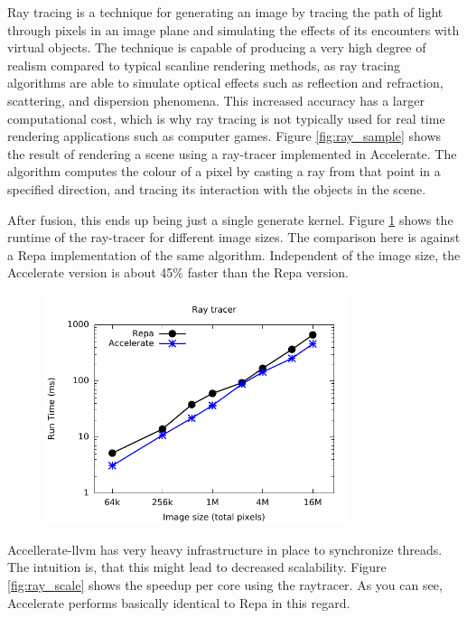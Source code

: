 \documentclass[a4paper,bibliography=totocnumbered,parskip,headsepline]{scrbook}
\begin{document}
Ray tracing is a technique for generating an image by tracing the path of light through pixels in an image plane and simulating the effects of its encounters with virtual objects.
The technique is capable of producing a very high degree of realism compared to typical scanline rendering methods, as ray tracing algorithms are able to simulate optical effects such as reflection and refraction, scattering, and dispersion phenomena.
This increased accuracy has a larger computational cost, which is why ray tracing is not typically used for real time rendering applications such as computer games.
Figure \ref{fig:ray_sample} shows the result of rendering a scene using a ray-tracer implemented in Accelerate.
The algorithm computes the colour of a pixel by casting a ray from that point in a specified direction, and tracing its interaction with the objects in the scene.

After fusion, this ends up being just a single generate kernel.
Figure \ref{fig:ray_bench} shows the runtime of the ray-tracer for different image sizes.
The comparison here is against a Repa implementation of the same algorithm.
Independent of the image size, the Accelerate version is about 45\% faster than the Repa version.
\begin{figure}
    \centering
    \includegraphics[width=0.8\textwidth]{images/benchmarks/ray/ray}
    \label{fig:ray_bench}
\end{figure}

Accellerate-llvm has very heavy infrastructure in place to synchronize threads.
The intuition is, that this might lead to decreased scalability.
Figure \ref{fig:ray_scale} shows the speedup per core using the raytracer.
As you can see, Accelerate performs basically identical to Repa in this regard.
\end{document}
